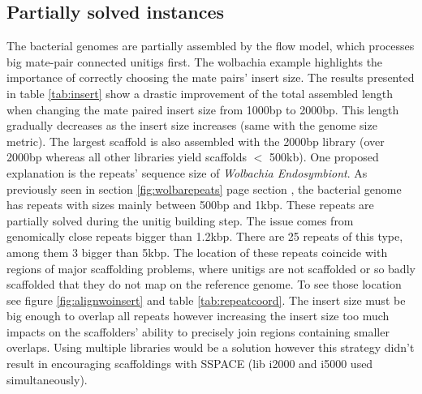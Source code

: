 \documentclass[12pt]{article}
\newcommand*{\fulleref}[1]{section \hyperref[{#1}] {\ref*{#1}} page {\pageref{#1}}}%
\begin{document}
\clearpage
\subsection{Partially solved instances}
The bacterial genomes are partially assembled by the flow model, which processes big mate-pair connected unitigs first. The wolbachia example highlights the importance of correctly choosing the mate pairs' insert size. The results presented in table \ref{tab:insert} show a drastic improvement of the total assembled length when changing the mate paired insert size from 1000bp to 2000bp. This length gradually decreases as the insert size increases (same with the genome size metric). The largest scaffold is also assembled with the 2000bp library (over 2000bp whereas all other libraries yield scaffolds $<$ 500kb). One proposed explanation is the repeats' sequence size of \textit{Wolbachia Endosymbiont}. As previously seen in \fulleref{fig:wolbarepeats} section  , the bacterial genome has repeats with sizes mainly between 500bp and 1kbp. These repeats are partially solved during the unitig building step. The issue comes from genomically close repeats bigger than 1.2kbp. There are 25 repeats of this type, among them 3 bigger than 5kbp. The location of these repeats coincide with regions of major scaffolding problems, where unitigs are not scaffolded or so badly scaffolded that they do not map on the reference genome. To see those location see figure \ref{fig:alignwoinsert} and table \ref{tab:repeatcoord}. The insert size must be big enough to overlap all repeats however increasing the insert size too much impacts on the scaffolders' ability to precisely join regions containing smaller overlaps. Using multiple libraries would be a solution however this strategy didn't result in encouraging scaffoldings with SSPACE (lib i2000 and i5000 used simultaneously). 
\end{document}
